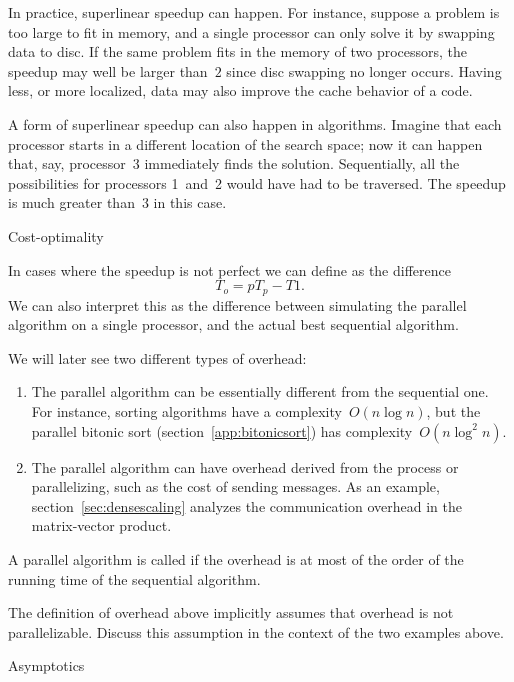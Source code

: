 In practice, superlinear speedup can happen. For instance, suppose a 
problem is too large to fit in memory, and a single processor can only
solve it by swapping data to disc. If the same problem fits in the
memory of two processors, the speedup may well be larger than~$2$
since disc swapping no longer occurs. Having less, or more localized,
data may also improve the cache behavior of a code.

A form of superlinear speedup can also happen in  algorithms.
Imagine that each processor starts in a different location of the search space;
now it can happen that, say, processor~3 immediately finds the solution.
Sequentially, all the possibilities for processors 1~and~2 would have had to be
traversed. The speedup is much greater than~3 in this case.

 {Cost-optimality}

In cases where the speedup is not perfect we can define
 as the difference \[ T_o = pT_p-T1. \]
We can also interpret this as the difference between simulating the
parallel algorithm on a single processor, and the actual best
sequential algorithm.

We will later see two different types of overhead:
\begin{enumerate}
\item The parallel algorithm can be essentially different from the
  sequential one. For instance, sorting algorithms have a
  complexity~$O(n\log n)$, but the parallel bitonic sort
  (section~\ref{app:bitonicsort}) has complexity~$O(n\log^2n)$.
\item The parallel algorithm can have overhead derived from the
  process or parallelizing, such as the cost of sending messages. As
  an example, section~\ref{sec:densescaling} analyzes the
  communication overhead in the matrix-vector product.
\end{enumerate}

A parallel algorithm is called  if the
overhead is at most of the order of the running time of the sequential
algorithm.

\begin{exercise}
  The definition of overhead above implicitly assumes that overhead is
  not parallelizable. Discuss this assumption in the context of the
  two examples above.
\end{exercise}

 {Asymptotics}
\label{sec:asymptotics}


